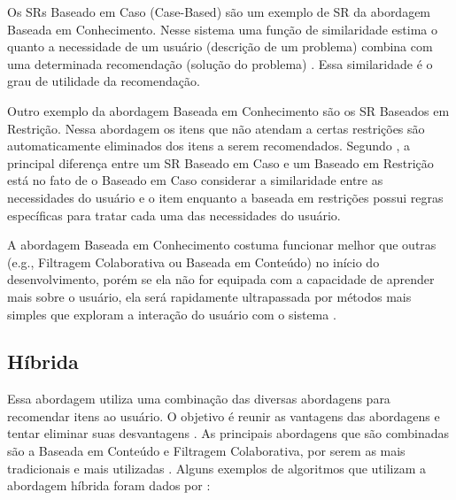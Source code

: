 Os SRs Baseado em Caso (Case-Based) são um exemplo de SR da abordagem Baseada em Conhecimento. Nesse sistema uma
função de similaridade estima o quanto a necessidade de um usuário (descrição de um problema) combina com uma
determinada recomendação (solução do problema) \cite{ricci2011introduction}. Essa similaridade é o grau de utilidade
da recomendação.

Outro exemplo da abordagem Baseada em Conhecimento são os SR Baseados em Restrição. Nessa abordagem os itens que não
atendam a certas restrições são automaticamente eliminados dos itens a serem recomendados. Segundo
, a principal diferença entre um SR Baseado em Caso e um Baseado em Restrição está
no fato de o Baseado em Caso considerar a similaridade entre as necessidades do usuário e o item enquanto a baseada
em restrições possui regras específicas para tratar cada uma das necessidades do usuário.

A abordagem Baseada em Conhecimento costuma funcionar melhor que outras (e.g., Filtragem Colaborativa ou Baseada em
Conteúdo) no início do desenvolvimento, porém se ela não for equipada com a capacidade de aprender mais sobre o usuário,
ela será rapidamente ultrapassada por métodos mais simples que exploram a interação do usuário com o sistema
\cite{ricci2011introduction}.

\subsection{Híbrida}

Essa abordagem utiliza uma combinação das diversas abordagens para recomendar itens ao usuário. O objetivo é reunir as
vantagens das abordagens e tentar eliminar suas desvantagens \cite{burke2002hybrid}. As principais abordagens que são
combinadas são a Baseada em Conteúdo e Filtragem Colaborativa, por serem as mais tradicionais e mais utilizadas
\cite{adomavicius2005toward, ricci2011introduction, bobadilla2013recommender}. Alguns exemplos de algoritmos que utilizam a abordagem híbrida foram dados por
:

